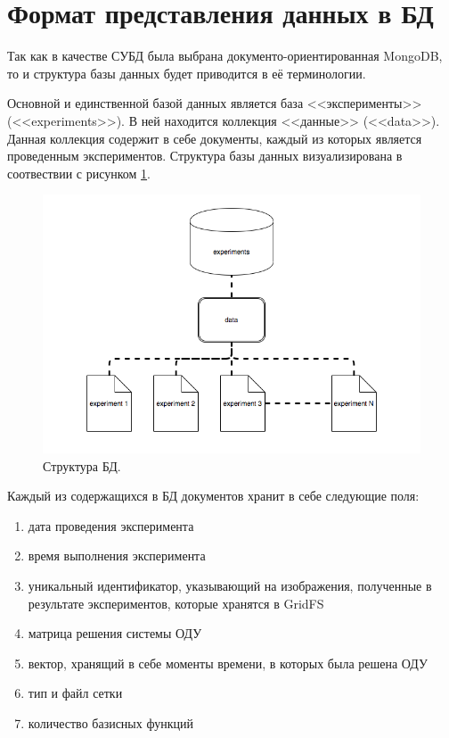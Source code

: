 \documentclass[14pt]{extreport}
\begin{document}
\section{Формат представления данных в БД}

Так как в качестве СУБД была выбрана документо-ориентированная MongoDB, то и структура базы данных будет приводится в её терминологии. 

Основной и единственной базой данных является база <<эксперименты>> (<<experiments>>). В ней находится коллекция  <<данные>> (<<data>>). Данная коллекция содержит в себе документы, каждый из которых является проведенным экспериментов. Структура базы данных визуализирована в соотвествии с рисунком \ref{img:database}.

\begin{figure}[H]
\centerline{
\includegraphics[width=1.0\linewidth]{images/database}}
\caption{Структура БД.}
\label{img:database}
\end{figure}

Каждый из содержащихся в БД документов хранит в себе следующие поля:

\begin{enumerate}
\item дата проведения эксперимента
\item время выполнения эксперимента
\item уникальный идентификатор, указывающий на изображения, полученные в результате экспериментов, которые хранятся в GridFS
\item матрица решения системы ОДУ
\item вектор, хранящий в себе моменты времени, в которых была решена ОДУ
\item тип и файл сетки
\item количество базисных функций
\end{enumerate}
\end{document}
